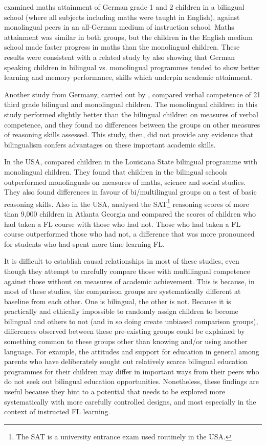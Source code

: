 \documentclass[output=paper]{langscibook}
\begin{document}
\citet{ZaunbauerMöller2010} examined maths attainment of German grade 1 and 2 children in a bilingual school (where all subjects including maths were taught in English), against monolingual peers in an all-German medium of instruction school. Maths attainment was similar in both groups, but the children in the English medium school made faster progress in maths than the monolingual children. These results were consistent with a related study by \citet{KuskaEtAl2010} also showing that German speaking children in bilingual vs. monolingual programmes tended to show better learning and memory performance, skills which underpin academic attainment.

Another study from Germany, carried out by \citet{GunzenhauserEtAl2019}, compared verbal competence of 21 third grade bilingual and monolingual children. The monolingual children in this study performed slightly better than the bilingual children on measures of verbal competence, and they found no differences between the groups on other measures of reasoning skills assessed. This study, then, did not provide any evidence that bilingualism confers advantages on these important academic skills.

In the USA, \citet{TaylorLafayette2010} compared children in the Louisiana State bilingual programme with monolingual children. They found that children in the bilingual schools outperformed monolinguals on measures of maths, science and social studies. They also found differences in favour of bi/multilingual groups on a test of basic reasoning skills. Also in the USA, \citet{CooperEtAl2008} analysed the SAT\footnote{The SAT is a university entrance exam used routinely in the USA.} reasoning scores of more than 9,000 children in Atlanta Georgia and compared the scores of children who had taken a FL course with those who had not. Those who had taken a FL course outperformed those who had not, a difference that was more pronounced for students who had spent more time learning FL. 

It is difficult to establish causal relationships in most of these studies, even though they attempt to carefully compare those with multilingual competence against those without on measures of academic achievement. This is because, in most of these studies, the comparison groups are systematically different at baseline from each other. One is bilingual, the other is not. Because it is practically and ethically impossible to randomly assign children to become bilingual and others to not (and in so doing create unbiased comparison groups), differences observed between these pre-existing groups could be explained by something common to these groups other than knowing and/or using another language. For example, the attitudes and support for education in general among parents who have deliberately sought out relatively scarce bilingual education programmes for their children may differ in important ways from their peers who do not seek out bilingual education opportunities. Nonetheless, these findings are useful because they hint to a potential that needs to be explored more systematically with more carefully controlled designs, and most especially in the context of instructed FL learning. 
\end{document}
